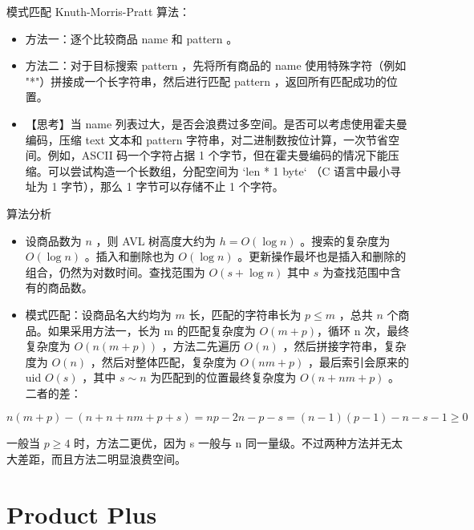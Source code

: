 \documentclass{beamer}
\begin{document}
\begin{frame}{模式匹配}
Knuth-Morris-Pratt 算法：
\begin{itemize}
\item 方法一：逐个比较商品 name 和 pattern 。
\item 方法二：对于目标搜索 pattern ，先将所有商品的 name 使用特殊字符（例如 "*"）拼接成一个长字符串，然后进行匹配 pattern ，返回所有匹配成功的位置。
\item 【思考】当 name 列表过大，是否会浪费过多空间。是否可以考虑使用霍夫曼编码，压缩 text 文本和 pattern 字符串，对二进制数按位计算，一次节省空间。例如，ASCII 码一个字符占据 1 个字节，但在霍夫曼编码的情况下能压缩。可以尝试构造一个长数组，分配空间为 `len * 1 byte` （C 语言中最小寻址为 1 字节），那么 1 字节可以存储不止 1 个字符。
\end{itemize}
\end{frame}


\begin{frame}{算法分析}
\begin{itemize}
\item 设商品数为 $n$ ，则 AVL 树高度大约为 $h = O(\log n)$ 。搜索的复杂度为 $O(\log n)$ 。插入和删除也为 $O(\log n)$ 。更新操作最坏也是插入和删除的组合，仍然为对数时间。查找范围为 $O(s + \log n)$ 其中 $s$ 为查找范围中含有的商品数。
\item 模式匹配：设商品名大约均为 $m$ 长，匹配的字符串长为 $p \leq m$ ，总共 $n$ 个商品。如果采用方法一，长为 m 的匹配复杂度为 $O(m + p)$，循环 n 次，最终复杂度为 $O(n(m + p))$ ，方法二先遍历 $O(n)$ ，然后拼接字符串，复杂度为 $O(n)$ ，然后对整体匹配，复杂度为 $O(nm + p)$ ，最后索引会原来的 uid $O(s)$ ，其中 $s \sim n$ 为匹配到的位置最终复杂度为 $O(n +nm + p)$ 。二者的差：
\end{itemize}
\begin{equation*}
n(m+p) - (n + n + nm + p + s) = np-2n-p-s = (n-1)(p-1) - n - s - 1 \geq 0
\end{equation*}

一般当 $p \geq 4$ 时，方法二更优，因为 s 一般与 n 同一量级。不过两种方法并无太大差距，而且方法二明显浪费空间。

\end{frame}


\section{Product Plus}
\end{document}
